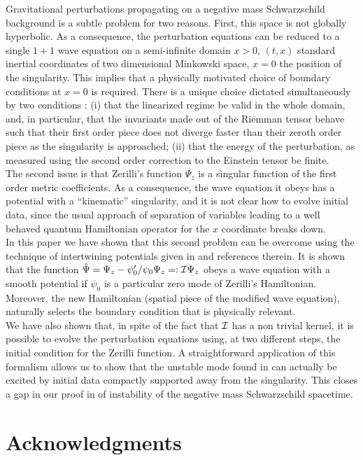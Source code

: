 \documentclass[aps,floats,showpacs,amssymb,tightenlines]{revtex4}
\begin{document}
Gravitational perturbations propagating on a negative mass Schwarzschild background is a subtle
problem for two reasons. First, this space is not globally hyperbolic. As a consequence,
the perturbation equations can be reduced to a single $1+1$ wave equation on a
semi-infinite domain $x>0$, $(t,x)$ standard inertial coordinates of two dimensional Minkowski space,
$x=0$ the position of the singularity. This implies that a physically motivated choice of boundary conditions
at $x=0$ is required. There is a unique choice dictated simultaneously by two conditions \cite{ghi,dg}: (i) that
the linearized regime be valid in the whole domain, and, in particular, that the invariants made out of the Riemman tensor
behave such that their first order piece does not diverge faster than their zeroth order piece as the singularity is approached;
 (ii) that the energy of
the perturbation, as measured using the second order correction to the Einstein tensor \cite{ghi} be finite.\\
The second issue is that  Zerilli's function $\Psi_z$ is a singular function of the first order metric coefficients. As a consequence, the wave
equation it obeys has  a potential  with a ``kinematic'' singularity, and it is not clear how to evolve
initial data, since the usual approach of separation of variables leading to a well behaved quantum Hamiltonian operator
for the $x$ coordinate breaks down.\\
In this paper we have shown that this second problem can be overcome using the technique of intertwining potentials
given in \cite{price} and references therein. It is shown that the function $\hat \Psi = \Psi_z - \psi_0'/\psi_0 \Psi_z =: {\cal I}
\Psi_z$
obeys a wave equation with a smooth potential if $\psi_0$ is a particular zero mode of Zerilli's Hamiltonian. Moreover,
the new Hamiltonian (spatial piece of the modified wave equation), naturally selects the boundary
condition that is physically relevant.\\
We have also shown that, in spite of the fact that ${\cal I}$ has a non trivial kernel, it is possible to
evolve the perturbation equations using, at two different steps, the initial condition for the Zerilli function.
A straightforward application of this formalism allows us to show that the unstable mode
found in \cite{dg} can actually be excited by initial data compactly supported away from the singularity. This
closes a gap in our proof in \cite{dg} of instability of the negative mass Schwarzschild spacetime.


\section*{Acknowledgments}
\end{document}
